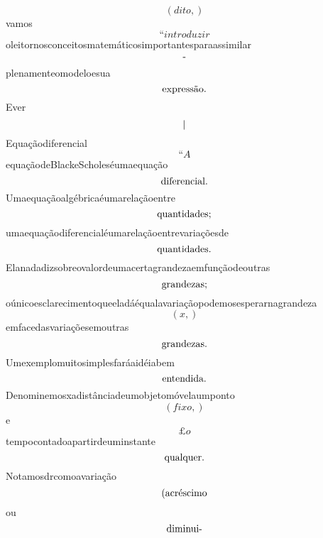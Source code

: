 \documentclass{article}
\begin{document}
\begin{equation}
\left( dito,\right)
\end{equation}vamos\begin{equation}
“introduzir
\end{equation}oleitornosconceitosmatemáticosimportantesparaassimilar\begin{equation}
$-$
\end{equation}plenamenteomodeloesua\begin{equation}
$expressão.$
\end{equation}Ever\begin{equation}
$|$
\end{equation}Equaçãodiferencial\begin{equation}
“A
\end{equation}equaçãodeBlackeScholeséumaequação\begin{equation}
$diferencial.$
\end{equation}Umaequaçãoalgébricaéumarelaçãoentre\begin{equation}
$quantidades;$
\end{equation}umaequaçãodiferencialéumarelaçãoentrevariaçõesde\begin{equation}
$quantidades.$
\end{equation}Elanadadizsobreovalordeumacertagrandezaemfunçãodeoutras\begin{equation}
$grandezas;$
\end{equation}oúnicoesclarecimentoqueeladáéqualavariaçãopodemosesperarnagrandeza\begin{equation}
\left( x,\right)
\end{equation}emfacedasvariaçõesemoutras\begin{equation}
$grandezas.$
\end{equation}Umexemplomuitosimplesfaráaidéiabem\begin{equation}
$entendida.$
\end{equation}Denominemosxadistânciadeumobjetomóvelaumponto\begin{equation}
\left( fixo,\right)
\end{equation}e\begin{equation}
£o
\end{equation}tempocontadoapartirdeuminstante\begin{equation}
$qualquer.$
\end{equation}Notamosdrcomoavariação\begin{equation}
$(acréscimo$
\end{equation}ou\begin{equation}
$diminui-$

\end{equation}
\end{document}
